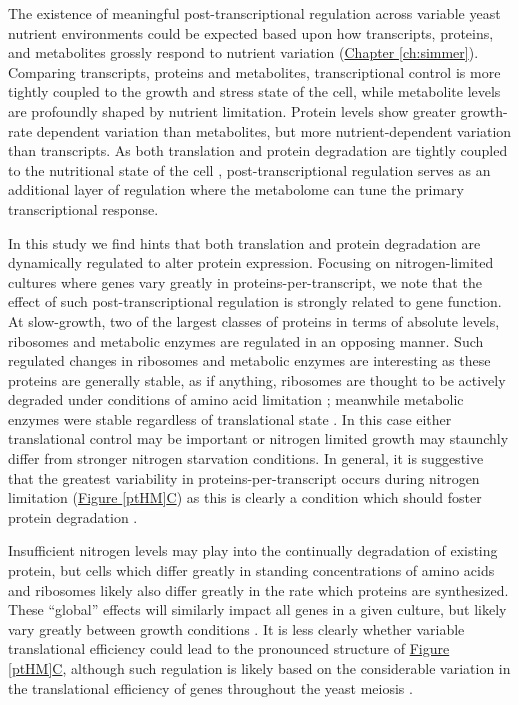 The existence of meaningful post-transcriptional regulation across variable yeast nutrient environments could be expected based upon how transcripts, proteins, and metabolites \cite{Boer:2010fb} grossly respond to nutrient variation (\hyperref[ch:simmer]{Chapter \ref{ch:simmer}}). Comparing transcripts, proteins and metabolites, transcriptional control is more tightly coupled to the growth and stress state of the cell, while metabolite levels are profoundly shaped by nutrient limitation. Protein levels show greater growth-rate dependent variation than metabolites, but more nutrient-dependent variation than transcripts. As both translation and protein degradation are tightly coupled to the nutritional state of the cell \cite{Klumpp:2009ic, Takeshige:1992wm}, post-transcriptional regulation serves as an additional layer of regulation where the metabolome can tune the primary transcriptional response.

In this study we find hints that both translation and protein degradation are dynamically regulated to alter protein expression. Focusing on nitrogen-limited cultures where genes vary greatly in proteins-per-transcript, we note that the effect of such post-transcriptional regulation is strongly related to gene function.  At slow-growth, two of the largest classes of proteins in terms of absolute levels, ribosomes and metabolic enzymes are regulated in an opposing manner. Such regulated changes in ribosomes and metabolic enzymes are interesting as these proteins are generally stable, as if anything, ribosomes are thought to be actively degraded under conditions of amino acid limitation \cite{Natarajan:2001ke, Washburn:2003ff, Zundel:2009dy}; meanwhile metabolic enzymes were stable regardless of translational state \cite{Belle:2006hv}. In this case either translational control may be important or nitrogen limited growth may staunchly differ from stronger nitrogen starvation conditions. In general, it is suggestive that the greatest variability in proteins-per-transcript occurs during nitrogen limitation (\hyperref[ptHM]{Figure \ref{ptHM}C}) as this is clearly a condition which should foster protein degradation \cite{Zundel:2009dy, Xu:2013do}.

Insufficient nitrogen levels may play into the continually degradation of existing protein, but cells which differ greatly in standing concentrations of amino acids and ribosomes likely also differ greatly in the rate which proteins are synthesized. These ``global'' effects will similarly impact all genes in a given culture, but likely vary greatly between growth conditions \cite{Klumpp:2009ic}. It is less clearly whether variable translational efficiency could lead to the pronounced structure of \hyperref[ptHM]{Figure \ref{ptHM}C}, although such regulation is likely based on the considerable variation in the translational efficiency of genes throughout the yeast meiosis \cite{Brar:2012ig}. 

